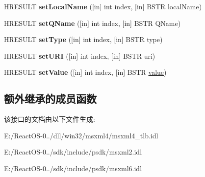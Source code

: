 \begin{DoxyCompactItemize}
\item 
\mbox{\label{interface_m_s_x_m_l2_1_1_i_m_x_attributes_a6d57f29035968575fa6230429fc587ab}} 
H\+R\+E\+S\+U\+LT {\bfseries set\+Local\+Name} (\mbox{[}in\mbox{]} int index, \mbox{[}in\mbox{]} B\+S\+TR local\+Name)
\item 
\mbox{\label{interface_m_s_x_m_l2_1_1_i_m_x_attributes_a232d41e67270e99da873bc3f833eeecd}} 
H\+R\+E\+S\+U\+LT {\bfseries set\+Q\+Name} (\mbox{[}in\mbox{]} int index, \mbox{[}in\mbox{]} B\+S\+TR Q\+Name)
\item 
\mbox{\label{interface_m_s_x_m_l2_1_1_i_m_x_attributes_af1da4296dc2d6d00330a4c93ad6a3c26}} 
H\+R\+E\+S\+U\+LT {\bfseries set\+Type} (\mbox{[}in\mbox{]} int index, \mbox{[}in\mbox{]} B\+S\+TR type)
\item 
\mbox{\label{interface_m_s_x_m_l2_1_1_i_m_x_attributes_a41517821f9ec6fa527e76a20104fbba2}} 
H\+R\+E\+S\+U\+LT {\bfseries set\+U\+RI} (\mbox{[}in\mbox{]} int index, \mbox{[}in\mbox{]} B\+S\+TR uri)
\item 
\mbox{\label{interface_m_s_x_m_l2_1_1_i_m_x_attributes_a8d4f99767c5717b8113784cba73859b2}} 
H\+R\+E\+S\+U\+LT {\bfseries set\+Value} (\mbox{[}in\mbox{]} int index, \mbox{[}in\mbox{]} B\+S\+TR \hyperlink{unionvalue}{value})
\end{DoxyCompactItemize}
\subsection*{额外继承的成员函数}


该接口的文档由以下文件生成\+:\begin{DoxyCompactItemize}
\item 
E\+:/\+React\+O\+S-\/0../dll/win32/msxml4/msxml4\+\_\+tlb.\+idl\item 
E\+:/\+React\+O\+S-\/0../sdk/include/psdk/msxml2.\+idl\item 
E\+:/\+React\+O\+S-\/0../sdk/include/psdk/msxml6.\+idl\end{DoxyCompactItemize}

